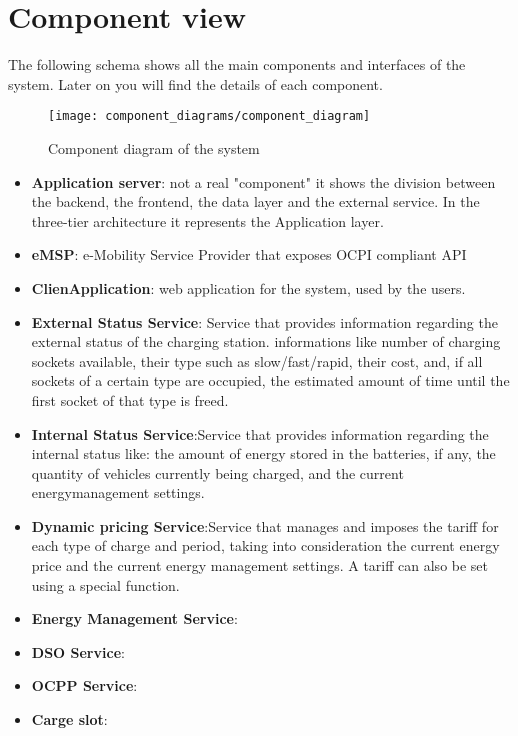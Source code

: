 \clearpage

\section{Component view}
The following schema shows all the main components and interfaces of the system. Later on you will find the details of each component.


\begin{figure}[h]
\centering
\texttt{[image: component\_diagrams/component\_diagram]}
\caption{Component diagram of the system}
\end{figure}

\clearpage
\newpage

\begin{itemize}
	\item \textbf{Application server}: not a real "component" it shows the division between the backend, the frontend, the data layer and the external service. In the three-tier architecture it represents the Application layer.
	\item \textbf{eMSP}: e-Mobility Service Provider that exposes OCPI compliant API
	\item \textbf{ClienApplication}: web application for the system, used by the users.
	\item \textbf{External Status Service}: Service that provides information regarding the external status of the charging station. informations like number of charging sockets available, their type such as slow/fast/rapid, their cost, and, if all sockets of a certain type are occupied, the estimated amount of time until the first socket of that type is freed.
	\item \textbf{Internal Status Service}:Service that provides information regarding the internal status like: the amount of energy stored in the batteries, if any, the quantity of vehicles currently being charged, and the current energymanagement settings.
	\item \textbf{Dynamic pricing Service}:Service that manages and imposes the tariff for each type of charge and period, taking into consideration the current energy price and the current energy management settings. A tariff can also be set using a special function.
	\item \textbf{Energy Management Service}:
	\item \textbf{DSO Service}:
	\item \textbf{OCPP Service}:
	\item \textbf{Carge slot}:

\end{itemize}
